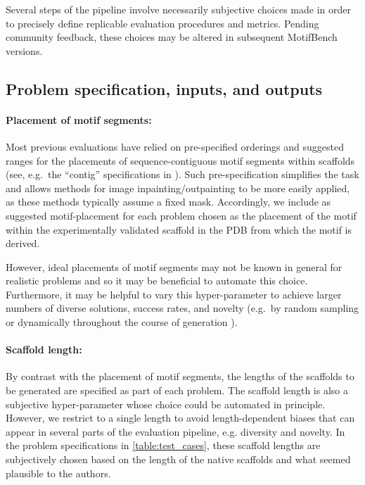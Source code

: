 Several steps of the pipeline involve necessarily subjective choices made in order to precisely define replicable evaluation procedures and metrics.
Pending community feedback, these choices may be altered in subsequent MotifBench versions.

\subsection*{Problem specification, inputs, and outputs}
\paragraph{Placement of motif segments:}
Most previous evaluations have relied on pre-specified orderings and suggested ranges for the placements of sequence-contiguous motif segments within scaffolds (see, e.g.\ the  ``contig'' specifications in \citep{watson2022broadly}).
Such pre-specification simplifies the task and allows methods for image inpainting/outpainting to be more easily applied, as these methods typically assume a fixed mask.
Accordingly, we include as suggested motif-placement for each problem chosen as the placement of the motif within the experimentally validated scaffold in the PDB from which the motif is derived.

However, ideal placements of motif segments may not be known in general for realistic problems and so it may be beneficial to automate this choice.
Furthermore, it may be helpful to vary this hyper-parameter to achieve larger numbers of diverse solutions,
success rates, and novelty (e.g.\ by random sampling \citep[see e.g.][]{watson2022broadly} or dynamically throughout the course of generation \citep[see e.g.][]{wu2024practical}).

\paragraph{Scaffold length:}
By contrast with the placement of motif segments, the lengths of the scaffolds to be generated are specified as part of each problem.
The scaffold length is also a subjective hyper-parameter whose choice could be automated in principle.
However, we restrict to a single length to avoid length-dependent biases that can appear in several parts of the evaluation pipeline, e.g. diversity and novelty.
In the problem specifications in \cref{table:test_cases}, these scaffold lengths are subjectively chosen based on the length of the native scaffolds and what seemed plausible to the authors.

